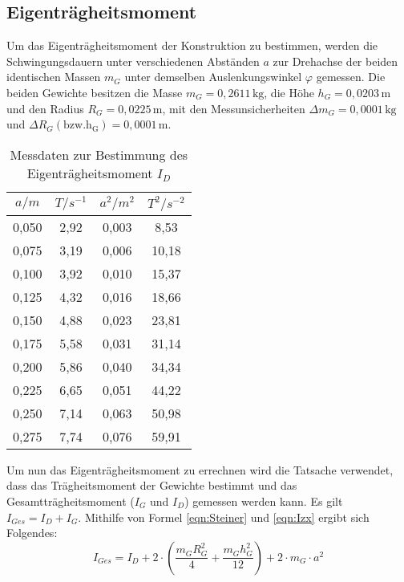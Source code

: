 \subsection{Eigenträgheitsmoment}
\label{sec:Eigentraegheitsmoment}
Um das Eigenträgheitsmoment der Konstruktion zu bestimmen, werden die Schwingungsdauern unter verschiedenen Abständen $a$ zur Drehachse
der beiden identischen Massen $m_G$ unter demselben Auslenkungswinkel $\varphi$ gemessen.
Die beiden Gewichte besitzen die Masse $m_G = 0,2611\, \mathrm{kg}$, die Höhe $h_G = 0,0203\, \mathrm{m}$ und den Radius $R_G = 0,0225\, \mathrm{m}$, mit
den Messunsicherheiten $\Delta m_G = 0,0001\, \mathrm{kg}$ und $\Delta R_G\mathrm{(bzw. h_G)} = 0,0001\, \mathrm{m}$.

\begin{table}
  \centering
  \caption{Messdaten zur Bestimmung des Eigenträgheitsmoment $I_D$}
  \label{tab:eigentrmom}
  \begin{tabular}{c c c c}
    \toprule
    $a/m$ & $T/s^{-1}$ & $a^2/m^2$ & $T^2/s^{-2}$ \\
    \midrule
    0,050 & 2,92 & 0,003 & 8,53 \\
    0,075 & 3,19 & 0,006 & 10,18 \\
    0,100 & 3,92 & 0,010 & 15,37 \\
    0,125 & 4,32 & 0,016 & 18,66 \\
    0,150 & 4,88 & 0,023 & 23,81 \\
    0,175 & 5,58 & 0,031 & 31,14 \\
    0,200 & 5,86 & 0,040 & 34,34 \\
    0,225 & 6,65 & 0,051 & 44,22 \\
    0,250 & 7,14 & 0,063 & 50,98 \\
    0,275 & 7,74 & 0,076 & 59,91 \\
    \bottomrule
  \end{tabular}
\end{table}

Um nun das Eigenträgheitsmoment zu errechnen wird die Tatsache verwendet, dass das Trägheitsmoment der Gewichte bestimmt und
das Gesamtträgheitsmoment ($I_G$ und $I_D$) gemessen werden kann. Es gilt $I_{Ges} = I_D + I_G$. Mithilfe von Formel \ref{eqn:Steiner} und \ref{eqn:Izx} ergibt sich Folgendes:
\begin{equation}
  \label{eqn:I_ges}
    I_{Ges} = I_D + 2 \cdot \left(\frac{m_G R_G^2}{4} + \frac{m_G h_G^2}{12} \right) + 2 \cdot m_G \cdot a^2
\end{equation}

